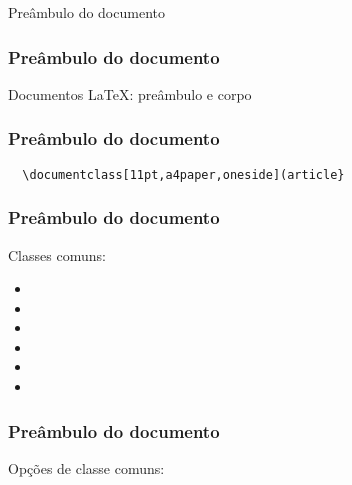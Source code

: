 \begin{frame}[standout]
  \Huge
  Preâmbulo do documento
\end{frame}

\begin{frame}
  \frametitle{Preâmbulo do documento}
  \LARGE
  Documentos \LaTeX: preâmbulo e corpo
\end{frame}

\begin{frame}[fragile]
  \frametitle{Preâmbulo do documento}
  \LARGE
  \begin{verbatim}
  \documentclass[11pt,a4paper,oneside](article}
  \end{verbatim}
\end{frame}

\begin{frame}[fragile]
  \frametitle{Preâmbulo do documento}
  \huge
  Classes comuns:
  \begin{multicols}{2}
    \begin{itemize}
      \item{}
      \item{}
      \item{}
      \item{}
      \item{}
      \item{}
  \end{itemize}
\end{multicols}
\end{frame}

\begin{frame}
  \frametitle{Preâmbulo do documento}
  \LARGE
  Opções de classe comuns:
  \begin{itemize}
  \end{itemize}
\end{frame}

\begin{frame}[standout]
  \Huge
\end{frame}

\begin{frame}[standout]
  \Huge
\end{frame}
